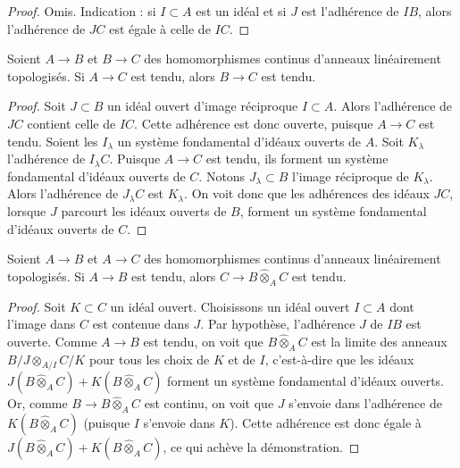 \begin{proof}
Omis. Indication : si $I \subset A$ est un idéal et si $J$ est l'adhérence
de $IB$, alors l'adhérence de $JC$ est égale à celle de $IC$.
\end{proof}

\begin{lemma}
\label{lemma-permanence-taut}
Soient $A \to B$ et $B \to C$ des homomorphismes continus d'anneaux
linéairement topologisés. Si $A \to C$ est tendu, alors
$B \to C$ est tendu.
\end{lemma}

\begin{proof}
Soit $J \subset B$ un idéal ouvert d'image réciproque $I \subset A$.
Alors l'adhérence de $JC$ contient celle de $IC$. Cette
adhérence est donc ouverte, puisque $A \to C$ est tendu. Soient les $I_\lambda$ un système fondamental
d'idéaux ouverts de $A$. Soit $K_\lambda$ l'adhérence de
$I_\lambda C$. Puisque $A \to C$ est tendu, ils forment un système fondamental
d'idéaux ouverts de $C$. Notons $J_\lambda \subset B$ l'image réciproque
de $K_\lambda$. Alors l'adhérence de $J_\lambda C$ est $K_\lambda$.
On voit donc que les adhérences des idéaux $JC$, lorsque $J$ parcourt
les idéaux ouverts de $B$, forment un système fondamental d'idéaux ouverts de $C$.
\end{proof}

\begin{lemma}
\label{lemma-base-change-taut}
Soient $A \to B$ et $A \to C$ des homomorphismes continus d'anneaux
linéairement topologisés. Si $A \to B$ est tendu, alors
$C \to B \widehat{\otimes}_A C$ est tendu.
\end{lemma}

\begin{proof}
Soit $K \subset C$ un idéal ouvert. Choisissons un idéal ouvert $I \subset A$
dont l'image dans $C$ est contenue dans $J$. Par hypothèse, l'adhérence $J$
de $IB$ est ouverte. Comme $A \to B$ est tendu, on voit que
$B \widehat{\otimes}_A C$ est la limite des anneaux $B/J \otimes_{A/I} C/K$
pour tous les choix de $K$ et de $I$, c'est-à-dire que
les idéaux $J(B \widehat{\otimes}_A C) + K(B \widehat{\otimes}_A C)$
forment un système fondamental d'idéaux ouverts. Or,
comme $B \to B \widehat{\otimes}_A C$ est continu, on voit
que $J$ s'envoie dans l'adhérence de $K(B \widehat{\otimes}_A C)$
(puisque $I$ s'envoie dans $K$). Cette adhérence est donc égale à
$J(B \widehat{\otimes}_A C) + K(B \widehat{\otimes}_A C)$,
ce qui achève la démonstration.
\end{proof}

